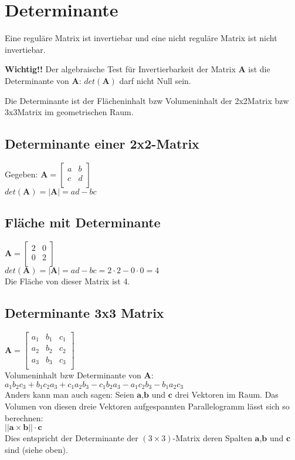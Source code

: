 \documentclass[../main.tex]{subfiles}
\begin{document}
\section{Determinante}
Eine reguläre Matrix ist invertiebar und eine nicht reguläre Matrix ist nicht invertiebar. 

\textbf{Wichtig!!} Der algebraische Test für Invertierbarkeit der Matrix $\mathbf{A}$ ist die Determinante von $\mathbf{A}$:
$det(\mathbf{A})$ darf nicht Null sein.

Die Determinante ist der Flächeninhalt bzw Volumeninhalt der 2x2Matrix bzw 3x3Matrix im geometrischen Raum.

\subsection{Determinante einer 2x2-Matrix}
Gegeben:
$\mathbf{A} =
\begin{bmatrix}
    a & b \\
    c & d \\
\end{bmatrix}$ \\
$det(\mathbf{A}) = |\mathbf{A}| = ad - bc$

\subsection{Fläche mit Determinante}
$\mathbf{A} =
\begin{bmatrix}
    2 & 0 \\
    0 & 2 \\
\end{bmatrix}$ \\
$det(\mathbf{A}) = |\mathbf{A}| = ad - bc = 2\cdot 2 - 0\cdot 0 = 4$ \\
Die Fläche von dieser Matrix ist 4.

\subsection{Determinante 3x3 Matrix}
$\mathbf{A} =
\begin{bmatrix}
    a_1 & b_1 & c_1 \\
    a_2 & b_2 & c_2 \\
    a_3 & b_3 & c_3 \\
\end{bmatrix}$ \\ [7pt]
Volumeninhalt bzw Determinante von $\mathbf{A}$: \\ [7pt]
$a_1b_2c_3 + b_1c_2a_3 + c_1a_2b_3 - c_1b_2a_3 - a_1c_2b_3 - b_1a_2c_3$ \\ [7pt]
Anders kann man auch sagen: Seien $\mathbf{a}$,$\mathbf{b}$ und $\mathbf{c}$ drei Vektoren im Raum. 
Das Volumen von diesen dreie Vektoren aufgespannten Parallelogramm lässt sich so berechnen: \\ [7pt]
$||\mathbf{a}\times \mathbf{b}|| \cdot \mathbf{c}$ \\ [7pt]
Dies entspricht der Determinante der $(3\times 3)$-Matrix deren Spalten $\mathbf{a}$,$\mathbf{b}$ und $\mathbf{c}$ sind (siehe oben).
\end{document}
